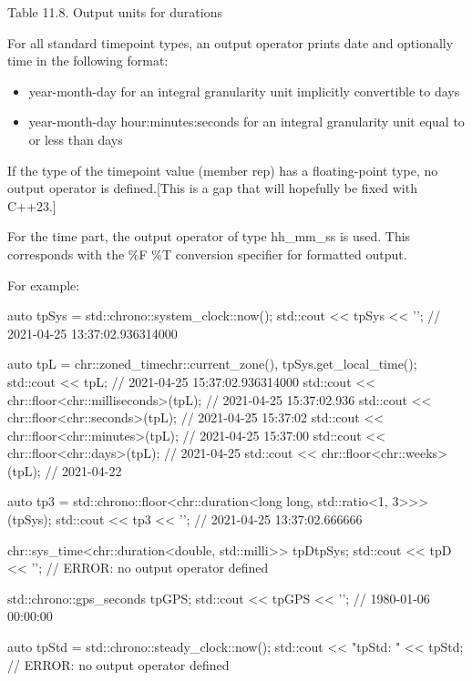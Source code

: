 \begin{center}
Table 11.8. Output units for durations
\end{center}

For all standard timepoint types, an output operator prints date and optionally time in the following format:

\begin{itemize}
\item 
year-month-day for an integral granularity unit implicitly convertible to days

\item 
year-month-day hour:minutes:seconds for an integral granularity unit equal to or less than days
\end{itemize}

If the type of the timepoint value (member rep) has a floating-point type, no output operator is defined.[This is a gap that will hopefully be fixed with C++23.]

For the time part, the output operator of type hh\_mm\_ss is used. This corresponds with the \%F \%T conversion specifier for formatted output.

For example:

\begin{cpp}
auto tpSys = std::chrono::system_clock::now();
std::cout << tpSys << '\n'; // 2021-04-25 13:37:02.936314000

auto tpL = chr::zoned_time{chr::current_zone(), tpSys}.get_local_time();
std::cout << tpL; // 2021-04-25 15:37:02.936314000
std::cout << chr::floor<chr::milliseconds>(tpL); // 2021-04-25 15:37:02.936
std::cout << chr::floor<chr::seconds>(tpL); // 2021-04-25 15:37:02
std::cout << chr::floor<chr::minutes>(tpL); // 2021-04-25 15:37:00
std::cout << chr::floor<chr::days>(tpL); // 2021-04-25
std::cout << chr::floor<chr::weeks>(tpL); // 2021-04-22

auto tp3 = std::chrono::floor<chr::duration<long long, std::ratio<1, 3>>>(tpSys);
std::cout << tp3 << '\n'; // 2021-04-25 13:37:02.666666

chr::sys_time<chr::duration<double, std::milli>> tpD{tpSys};
std::cout << tpD << '\n'; // ERROR: no output operator defined

std::chrono::gps_seconds tpGPS;
std::cout << tpGPS << '\n'; // 1980-01-06 00:00:00

auto tpStd = std::chrono::steady_clock::now();
std::cout << "tpStd: " << tpStd; // ERROR: no output operator defined
\end{cpp}

